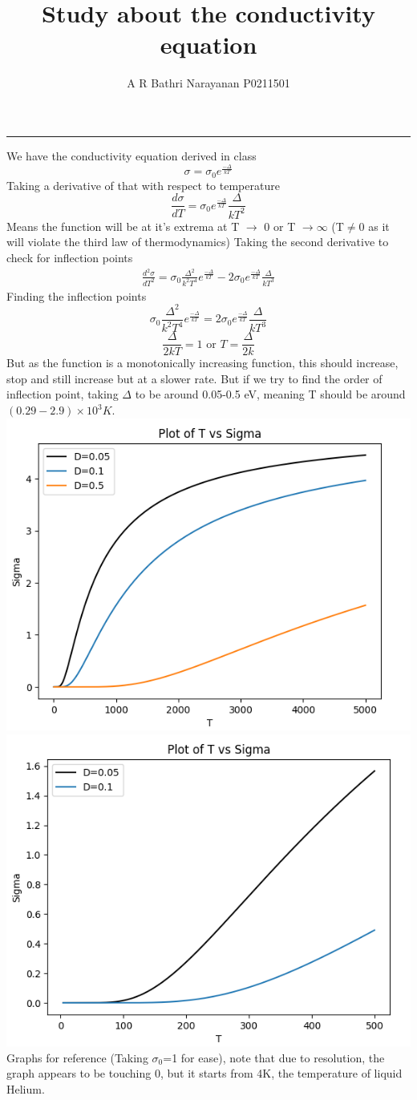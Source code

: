 \documentclass[12pt,a4paper]{article}
\title{Study about the conductivity equation}
\author{A R Bathri Narayanan P0211501}
\date{}
\begin{document}
	\maketitle
	\par\noindent\rule{\textwidth}{0.4pt}
	We have the conductivity equation derived in class
	\[\sigma = \sigma_0 e^{\frac{-\Delta}{kT}}\]
	Taking a derivative of that with respect to temperature
	\[\frac{d\sigma}{dT}=\sigma_0e^{\frac{-\Delta}{kT}}\frac{\Delta}{kT^2}\]
	Means the function will be at it's extrema at T $\rightarrow$ 0 or T $\rightarrow \infty$ (T$\neq$0 as it will violate the third law of thermodynamics)
	Taking the second derivative to check for inflection points
	\begin{align*}
		\frac{d^2\sigma}{dT^2}=\sigma_0\frac{\Delta^2}{k^2T^4}e^{\frac{-\Delta}{kT}}-2\sigma_0e^{\frac{-\Delta}{kT}}\frac{\Delta}{kT^3}
	\end{align*}
	Finding the inflection points
	\[\sigma_0\frac{\Delta^2}{k^2T^4}e^{\frac{-\Delta}{kT}}=2\sigma_0e^{\frac{-\Delta}{kT}}\frac{\Delta}{kT^3}\]
	\[\frac{\Delta}{2kT}=1 \text{ or } T = \frac{\Delta}{2k}\]
	 But as the function is a monotonically increasing function, this should increase, stop and still increase but at a slower rate.
	 But if we try to find the order of inflection point, taking $\Delta$ to be around 0.05-0.5 eV, meaning T should be around $(0.29-2.9) \times 10^{3} K.$\\
	 \includegraphics[width=10 cm]{sigma1.png}
	  \includegraphics[width=10 cm]{sigma2.png}
	  Graphs for reference (Taking $\sigma_0$=1 for ease), note that due to resolution, the graph appears to be touching 0, but it starts from 4K, the temperature of liquid Helium.
\end{document}
